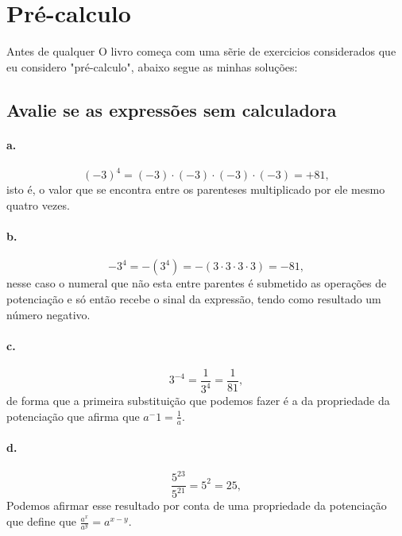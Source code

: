 

\section{Pré-calculo}
Antes de qualquer O livro começa com uma sẽrie de exercicios considerados que eu considero "pré-calculo", abaixo segue as minhas soluções:



\subsection{Avalie se as expressões sem calculadora}

	\paragraph{a.}
	\begin{equation}
	(-3)^4 = (-3)\cdot(-3)\cdot(-3)\cdot(-3) = +81,
	\end{equation}
	 isto é, o valor que se encontra entre os parenteses multiplicado por ele mesmo quatro vezes.

	\paragraph{b.}
	\begin{equation}
	-3^4 = -(3^4) = -(3\cdot3\cdot3\cdot3) = -81,
	\end{equation}
	 nesse caso o numeral que não esta entre parentes é submetido as operações de potenciação e só então recebe o sinal da expressão, tendo como resultado um número negativo.

	\paragraph{c.}
	\begin{equation}
	3^{-4} = \frac{1}{3^4} = \frac{1}{81},
	\end{equation}
	 de forma que a primeira substituição que podemos fazer é a da propriedade da potenciação que afirma que $a^-1 = \frac{1}{a}$.

	\paragraph{d.}
	\begin{equation}
	\frac{5^{23}}{5^{21}} = 5^2 = 25,
	\end{equation}
	Podemos afirmar esse resultado por conta de uma propriedade da potenciação que define que $\frac{a^x}{a^y} = a^{x-y}$.

